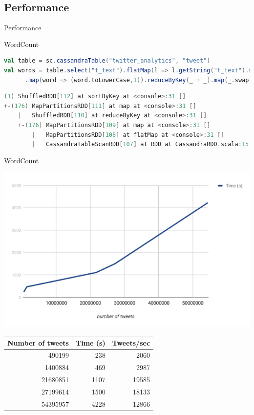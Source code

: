 \documentclass{beamer}
\newcommand{\pdfnote}[1]{\marginnote{\pdfcomment[icon=note]{#1}}}
\newcommand{\hugeframe}[1]{
\begin{frame}[c]
  \begin{center}
    \huge\textcolor{title}{#1}
  \end{center}

\end{frame}
}
\begin{document}
\subsection{Performance}
\hugeframe{Performance}

\begin{frame}[fragile]{WordCount}
\begin{lstlisting}[language=scala,caption={WordCount Spark script}]
val table = sc.cassandraTable("twitter_analytics", "tweet")
val words = table.select("t_text").flatMap(l => l.getString("t_text").split(" "))
      .map(word => (word.toLowerCase,1)).reduceByKey(_ + _).map(_.swap).sortByKey(false,1)
\end{lstlisting}

\begin{lstlisting}[language=scala,caption={Debug string rdd}]
(1) ShuffledRDD[112] at sortByKey at <console>:31 []
+-(176) MapPartitionsRDD[111] at map at <console>:31 []
    |   ShuffledRDD[110] at reduceByKey at <console>:31 []
    +-(176) MapPartitionsRDD[109] at map at <console>:31 []
        |   MapPartitionsRDD[108] at flatMap at <console>:31 []
        |   CassandraTableScanRDD[107] at RDD at CassandraRDD.scala:15 []
\end{lstlisting}

\end{frame}


\begin{frame}{WordCount}
    \begin{center}
      \includegraphics[width=.5\textwidth]{Figures/wordcountplot}
      \pdfnote{27M in 25 min}
       \begin{table}
      \centering
        \begin{tabular}{r r r}
        \hline
        \textbf{Number of tweets} & \textbf{Time (s)} & \textbf{Tweets/sec}\\
        \hline
        490199 & 238 & 2060 \\
        \hline
        1400884 & 469 & 2987 \\
        \hline
        21680851 & 1107 & 19585 \\
        \hline
        27199614 & 1500 & 18133 \\
        \hline
        54395957 & 4228 & 12866 \\
        \hline
        \end{tabular}
      \end{table}

    \end{center}
\end{frame}
\end{document}
